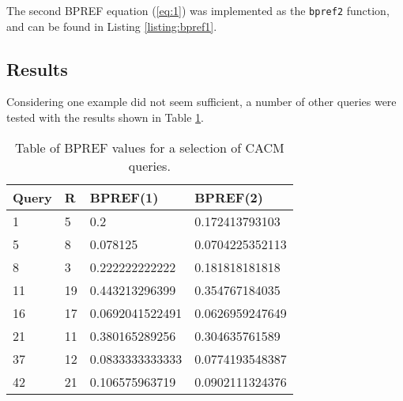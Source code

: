 

\clearpage

The second BPREF equation (\ref{eq:1}) was implemented as the \texttt{bpref2} function, and can be found in Listing \ref{listing:bpref1}.




\subsection{Results}
Considering one example did not seem sufficient, a number of other queries were tested with the results shown in Table \ref{tab:bpref}.

\begin{table}[H]
\centering
\begin{tabular}{ | l | l | l | l |}
\hline
Query & R & BPREF(1) & BPREF(2) \\
\hline
1 & 5 & 0.2 & 0.172413793103\\
\hline
5 & 8 & 0.078125 & 0.0704225352113\\
\hline
8 & 3 & 0.222222222222 & 0.181818181818\\
\hline
11 & 19 & 0.443213296399 & 0.354767184035\\
\hline
16 & 17 & 0.0692041522491 & 0.0626959247649\\
\hline
21 & 11 & 0.380165289256 & 0.304635761589\\
\hline
37 & 12 & 0.0833333333333 & 0.0774193548387\\
\hline
42 & 21 & 0.106575963719 & 0.0902111324376\\
\hline
\end{tabular}
\caption{Table of BPREF values for a selection of CACM queries.}
\label{tab:bpref}
\end{table}
